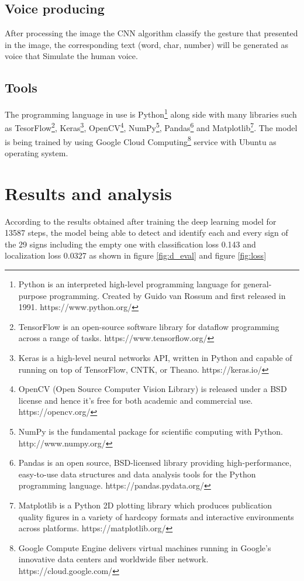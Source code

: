 \documentclass[12pt]{report}
\begin{document}
\section{Voice producing}

After processing the image the CNN algorithm classify the gesture
that presented in the image, the corresponding text (word, char, number)
will be generated as voice that Simulate the human voice. 

\section{Tools}

The programming language in use is Python\footnote{Python is an interpreted
high-level programming language for general-purpose programming. Created by
Guido van Rossum and first released in 1991. https://www.python.org/} 
along side with many
libraries such as TesorFlow\footnote{TensorFlow is an open-source software 
library for dataflow programming across a range of tasks. https://www.tensorflow.org/},
Keras\footnote{Keras is a high-level neural networks API, written in Python and 
capable of running on top of TensorFlow, CNTK, or Theano. https://keras.io/}, 
OpenCV\footnote{OpenCV (Open Source Computer Vision Library) is released under 
a BSD license and hence it’s free for both academic and commercial use.
https://opencv.org/}, NumPy\footnote{NumPy is the fundamental package for 
scientific computing with Python. http://www.numpy.org/}, 
Pandas\footnote{Pandas is an open source, BSD-licensed library providing 
high-performance, easy-to-use data structures and data analysis tools for 
the Python programming language. https://pandas.pydata.org/}
and Matplotlib\footnote{Matplotlib is a Python 2D plotting library 
which produces publication quality figures in a variety of hardcopy 
formats and interactive environments across platforms. https://matplotlib.org/}.
The model is being trained by using Google Cloud Computing\footnote{Google Compute 
Engine delivers virtual machines running in Google's innovative data centers and
worldwide fiber network. https://cloud.google.com/} service with Ubuntu as 
operating system.

\chapter{Results and analysis}
According to the results obtained after training the deep learning model for 13587 steps,
the model being able to detect and identify each and every sign of the 29 signs including 
the empty one with classification loss 0.143 and localization loss 0.0327
as shown in figure \ref{fig:d_eval} and figure \ref{fig:loss}
\bigbreak
\end{document}

